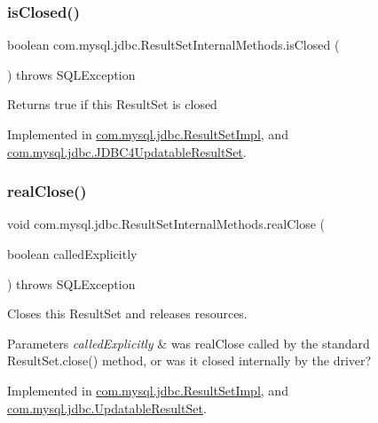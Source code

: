 \subsubsection{\texorpdfstring{is\+Closed()}{isClosed()}}
{\footnotesize\ttfamily boolean com.\+mysql.\+jdbc.\+Result\+Set\+Internal\+Methods.\+is\+Closed (\begin{DoxyParamCaption}{ }\end{DoxyParamCaption}) throws S\+Q\+L\+Exception}

Returns true if this Result\+Set is closed 

Implemented in \mbox{\hyperlink{classcom_1_1mysql_1_1jdbc_1_1_result_set_impl_a39bb407e38c65cf1779e8fd341ac08b5}{com.\+mysql.\+jdbc.\+Result\+Set\+Impl}}, and \mbox{\hyperlink{classcom_1_1mysql_1_1jdbc_1_1_j_d_b_c4_updatable_result_set_a401f43b6faaf6b96e768afa1b3a4e87e}{com.\+mysql.\+jdbc.\+J\+D\+B\+C4\+Updatable\+Result\+Set}}.

\mbox{\label{interfacecom_1_1mysql_1_1jdbc_1_1_result_set_internal_methods_a04e640b79d91cb9a0eefecf583740187}} 
\subsubsection{\texorpdfstring{real\+Close()}{realClose()}}
{\footnotesize\ttfamily void com.\+mysql.\+jdbc.\+Result\+Set\+Internal\+Methods.\+real\+Close (\begin{DoxyParamCaption}\item[{boolean}]{called\+Explicitly }\end{DoxyParamCaption}) throws S\+Q\+L\+Exception}

Closes this Result\+Set and releases resources.


\begin{DoxyParams}{Parameters}
{\em called\+Explicitly} & was real\+Close called by the standard Result\+Set.\+close() method, or was it closed internally by the driver? \\
\hline
\end{DoxyParams}


Implemented in \mbox{\hyperlink{classcom_1_1mysql_1_1jdbc_1_1_result_set_impl_ab017e327bc96791e541af9d87b228472}{com.\+mysql.\+jdbc.\+Result\+Set\+Impl}}, and \mbox{\hyperlink{classcom_1_1mysql_1_1jdbc_1_1_updatable_result_set_a56e7da4266eef885ba3dfc5005e30525}{com.\+mysql.\+jdbc.\+Updatable\+Result\+Set}}.

